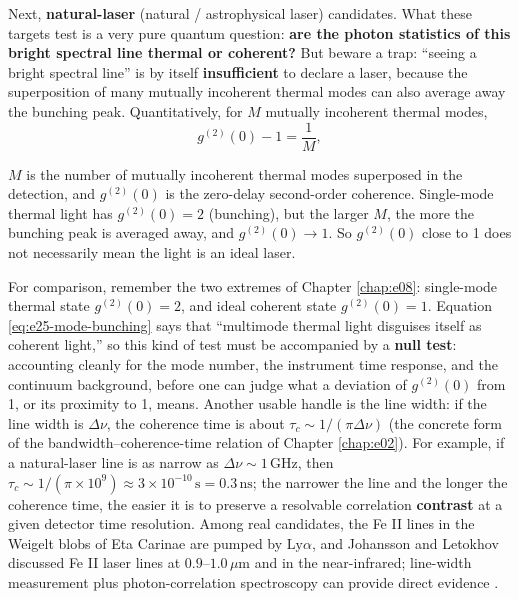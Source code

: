 Next, \textbf{natural-laser} (natural / astrophysical laser) candidates. What these targets test is a very pure quantum question: \textbf{are the photon statistics of this bright spectral line thermal or coherent?} But beware a trap: ``seeing a bright spectral line'' is by itself \textbf{insufficient} to declare a laser, because the superposition of many mutually incoherent thermal modes can also average away the bunching peak. Quantitatively, for \(M\) mutually incoherent thermal modes,
\begin{equation}
  g^{(2)}(0)-1
  =
  \frac{1}{M},
  \label{eq:e25-mode-bunching}
\end{equation}
\begin{formulaexplain}
\(M\) is the number of mutually incoherent thermal modes superposed in the detection, and \(g^{(2)}(0)\) is the zero-delay second-order coherence. Single-mode thermal light has \(g^{(2)}(0)=2\) (bunching), but the larger \(M\), the more the bunching peak is averaged away, and \(g^{(2)}(0)\to1\). So \(g^{(2)}(0)\) close to 1 does not necessarily mean the light is an ideal laser.
\end{formulaexplain}
For comparison, remember the two extremes of Chapter \ref{chap:e08}: single-mode thermal state \(g^{(2)}(0)=2\), and ideal coherent state \(g^{(2)}(0)=1\). Equation \eqref{eq:e25-mode-bunching} says that ``multimode thermal light disguises itself as coherent light,'' so this kind of test must be accompanied by a \textbf{null test}: accounting cleanly for the mode number, the instrument time response, and the continuum background, before one can judge what a deviation of \(g^{(2)}(0)\) from 1, or its proximity to 1, means. Another usable handle is the line width: if the line width is \(\Delta\nu\), the coherence time is about \(\tau_c\sim1/(\pi\Delta\nu)\) (the concrete form of the bandwidth--coherence-time relation of Chapter \ref{chap:e02}). For example, if a natural-laser line is as narrow as \(\Delta\nu\sim1\,\mathrm{GHz}\), then \(\tau_c\sim1/(\pi\times10^9)\approx3\times10^{-10}\,\mathrm{s}=0.3\,\mathrm{ns}\); the narrower the line and the longer the coherence time, the easier it is to preserve a resolvable correlation \textbf{contrast} at a given detector time resolution. Among real candidates, the Fe II lines in the Weigelt blobs of Eta Carinae are pumped by \(\mathrm{Ly}\alpha\), and Johansson and Letokhov discussed Fe II laser lines at \(0.9\text{--}1.0\,\mu\mathrm{m}\) and in the near-infrared; line-width measurement plus photon-correlation spectroscopy can provide direct evidence \citep{2004A&A...428..497J,2005NewA...10..361J,2008AIPC..984..216D}.

